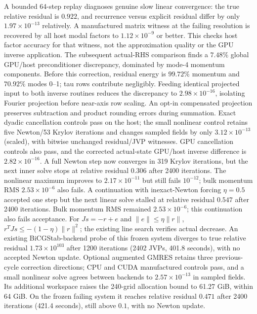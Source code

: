 \documentclass[aps,prd,preprint,notitlepage,nofootinbib]{revtex4-2}
\begin{document}
A bounded 64-step replay diagnoses genuine slow linear convergence: the
true relative residual is $0.922$, and recurrence versus explicit residual
differ by only $1.97\times10^{-13}$ relatively. A manufactured matrix witness
at the failing resolution is recovered by all host modal factors to
$1.12\times10^{-9}$ or better. This checks host factor accuracy for that
witness, not the approximation quality or the GPU inverse application.
The subsequent actual-RHS comparison finds a $7.48\%$ global GPU/host
preconditioner discrepancy, dominated by mode-4 momentum components.
Before this correction, residual energy is $99.72\%$ momentum and $70.92\%$ modes 0--1;
tau rows contribute negligibly. Feeding identical projected input to both
inverse routines reduces the discrepancy to $2.98\times10^{-16}$, isolating
Fourier projection before near-axis row scaling. An opt-in compensated
projection preserves subtraction and product rounding errors during summation.
Exact dyadic cancellation controls pass on the host; the small nonlinear
control retains five Newton/53 Krylov iterations and changes sampled fields
by only $3.12\times10^{-13}$ (scaled), with bitwise unchanged residual/JVP
witnesses. GPU cancellation controls also pass, and the corrected actual-state
GPU/host inverse difference is $2.82\times10^{-16}$. A full Newton step now
converges in 319 Krylov iterations, but the next inner solve stops at relative
residual $0.306$ after 2400 iterations. The nonlinear maximum improves to
$2.17\times10^{-11}$ but still fails $10^{-12}$; bulk momentum RMS
$2.53\times10^{-6}$ also fails. A continuation with inexact-Newton forcing
$\eta=0.5$ accepted one step but the next linear solve stalled at relative
residual $0.547$ after 2400 iterations. Bulk momentum RMS remained
$2.53\times10^{-6}$; this continuation also fails acceptance.
For $Js=-r+e$ and $\|e\|\leq\eta\|r\|$,
$r^TJs\leq-(1-\eta)\|r\|^2$; the existing line search verifies actual decrease.
An existing BiCGStab-backend probe of this frozen system diverges to true
relative residual $1.73\times10^{103}$ after 1200 iterations (2402 JVPs,
401.8 seconds), with no accepted Newton update.
Optional augmented GMRES retains three previous-cycle correction directions;
CPU and CUDA manufactured controls pass, and a small nonlinear solve agrees
between backends to $2.57\times10^{-13}$ in sampled fields. Its additional
workspace raises the 240-grid allocation bound to 61.27 GiB, within 64 GiB.
On the frozen failing system it reaches relative residual $0.471$ after
2400 iterations (421.4 seconds), still above $0.1$, with no Newton update.
\end{document}
